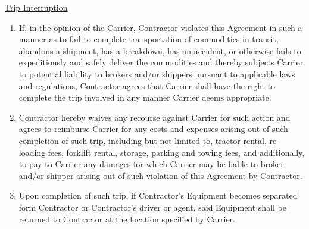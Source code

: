 \underline{Trip Interruption}
\begin{enumerate}[
    ref = \SecondLevelEnumerator
]
    \item If, in the opinion of the Carrier, Contractor violates this
    Agreement in such a manner as to fail to complete transportation of
    commodities in transit, abandons a shipment, has a breakdown, has an
    accident, or otherwise fails to expeditiously and safely deliver the
    commodities and thereby subjects Carrier to potential liability to
    brokers and/or shippers pursuant to applicable laws and regulations,
    Contractor agrees that Carrier shall have the right to complete the
    trip involved in any manner Carrier deems appropriate.

    \item Contractor hereby waives any recourse against Carrier for such
    action and agrees to reimburse Carrier for any costs and expenses
    arising out of such completion of such trip, including but not limited
    to, tractor rental, re-loading fees, forklift rental, storage, parking
    and towing fees, and additionally, to pay to Carrier any damages for
    which Carrier may be liable to broker and/or shipper arising out of
    such violation of this Agreement by Contractor.

    \item Upon completion of such trip, if Contractor's Equipment becomes
    separated form Contractor or Contractor's driver or agent, said
    Equipment shall be returned to Contractor at the location specified by
    Carrier.
\end{enumerate}